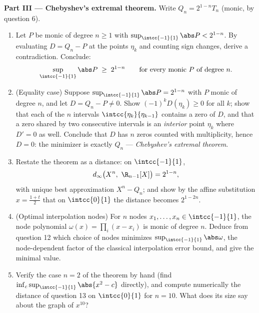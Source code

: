 \begin{problem}
\medskip
\noindent\textbf{Part III --- Chebyshev's extremal theorem.}
Write $Q_n = 2^{1-n}T_n$ (monic, by question 6).
\begin{enumerate}[resume]
  \item Let $P$ be monic of degree $n \geq 1$ with
        $\sup_{\intcc{-1}{1}}\abs P < 2^{1-n}$. By evaluating $D
        = Q_n - P$ at the points $\eta_k$ and counting sign
        changes, derive a contradiction. Conclude:
        \[
        \sup_{\intcc{-1}{1}}\abs P \;\geq\; 2^{1-n}
        \qquad\text{for every monic } P \text{ of degree } n.
        \]
  \item (Equality case) Suppose $\sup_{\intcc{-1}{1}}\abs P =
        2^{1-n}$ with $P$ monic of degree $n$, and let $D = Q_n
        - P \neq 0$. Show $(-1)^kD(\eta_k) \geq 0$ for all $k$;
        show that each of the $n$ intervals
        $\intcc{\eta_{k}}{\eta_{k-1}}$ contains a zero of $D$,
        and that a zero shared by two consecutive intervals is
        an \emph{interior} point $\eta_k$ where $D' = 0$ as
        well. Conclude that $D$ has $n$ zeros counted with
        multiplicity, hence $D = 0$: the minimizer is exactly
        $Q_n$ --- \emph{Chebyshev's extremal theorem}.
  \item Restate the theorem as a distance: on $\intcc{-1}{1}$,
        \[
        d_\infty\bigl(X^n,\ \R_{n-1}[X]\bigr) = 2^{1-n},
        \]
        with unique best approximation $X^n - Q_n$; and show by
        the affine substitution $x = \frac{1+t}2$ that on
        $\intcc{0}{1}$ the distance becomes $2^{1-2n}$.
  \item (Optimal interpolation nodes) For $n$ nodes $x_1, \dots,
        x_n \in \intcc{-1}{1}$, the node polynomial
        $\omega(x) = \prod_i(x - x_i)$ is monic of degree $n$.
        Deduce from question 12 which choice of nodes minimizes
        $\sup_{\intcc{-1}{1}}\abs\omega$, the node-dependent
        factor of the classical interpolation error bound, and
        give the minimal value.
  \item Verify the case $n = 2$ of the theorem by hand (find
        $\inf_c \sup_{\intcc{-1}{1}}\abs{x^2 - c}$ directly),
        and compute numerically the distance of question 13 on
        $\intcc{0}{1}$ for $n = 10$. What does its size say
        about the graph of $x^{10}$?
\end{enumerate}


\end{problem}
